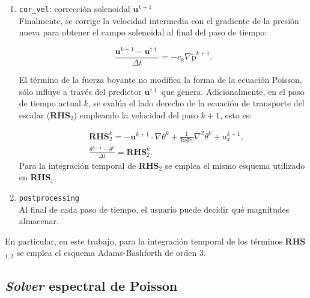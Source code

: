 \begin{enumerate}
	\item  \texttt{cor\_vel}: corrección solenoidal $\mathbf{u}^{k+1}$ \\
	Finalmente, se corrige la velocidad intermedia con el gradiente de la presión nueva para obtener
el campo solenoidal al final del paso de tiempo:

\begin{equation}
\frac{ \mathbf{u}^{k+1} - \mathbf{u}^{\dagger \dagger} }{\Delta t} = - c_k \nabla \widetilde{\text{p}}^{k+1} \text{.}
\end{equation}

El término de la fuerza boyante no modifica la forma de la ecuación Poisson, sólo influye a través del predictor $\mathbf{u}^{\dagger \dagger}$ que genera. Adicionalmente, en el paso de tiempo actual $k$, se evalúa el lado derecho de la ecuación de transporte del escalar (\textbf{RHS}$_2$) empleando la velocidad del paso $k+1$, esto es:

\begin{equation}
\begin{aligned}
& \textbf{RHS}_2^k = - \mathbf{u}^{k+1} \cdot \nabla \theta^k + \frac{1}{\text{Re} \text{Pr}} \nabla^2 \theta^k + u_x^{k+1}, \\
& \frac{\theta^{k+1} - \theta^{k}}{\Delta t} = \textbf{RHS}_2^k \text{.}
\end{aligned}
\end{equation}
Para la integración temporal de \textbf{RHS}$_2$ se emplea el mismo esquema utilizado en \textbf{RHS}$_1$.

	\item \texttt{postprocessing} \\
	Al final de cada paso de tiempo, el usuario puede decidir qué magnitudes almacenar.

\end{enumerate}

En particular, en este trabajo, para la integración temporal de los términos \textbf{RHS}$_{1,2}$ se emplea el esquema Adams-Bashforth de orden 3.



\subsection{\textit{Solver} espectral de Poisson}


